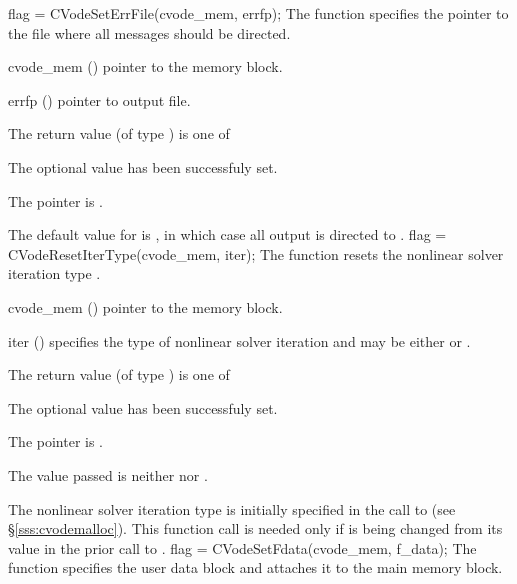 {
flag = CVodeSetErrFile(cvode\_mem, errfp);
}
{
  The function  specifies the pointer to the file
  where all {\cvodes} messages should be directed.
}
{
  \begin{args}
  \item[cvode\_mem] ()
    pointer to the {\cvodes} memory block.
  \item[errfp] ()
    pointer to output file.
  \end{args}
}
{
  The return value  (of type ) is one of
  \begin{args}
  \item[\Id{SUCCESS}] 
    The optional value has been successfuly set.
  \item[\Id{CVS\_NO\_MEM}]
    The  pointer is .
  \end{args}
}
{
  The default value for  is , in which case
  all output is directed to .
}
{
flag = CVodeResetIterType(cvode\_mem, iter);
}
{
  The function  resets the nonlinear solver
  iteration type .
}
{
  \begin{args}
  \item[cvode\_mem] ()
    pointer to the {\cvodes} memory block.
  \item[iter] ()
    specifies the type of nonlinear solver iteration and may be
    either  or . 
  \end{args}
}
{
  The return value  (of type ) is one of
  \begin{args}
  \item[\Id{SUCCESS}] 
    The optional value has been successfuly set.
  \item[\Id{CVS\_NO\_MEM}]
    The  pointer is .
  \item[\Id{CVS\_ILL\_INPUT}]
    The  value passed is neither  nor .
  \end{args}
}
{
  The nonlinear solver iteration type is initially specified in the call
  to  (see \S\ref{sss:cvodemalloc}). This function call is
  needed only if  is being changed from its value in the prior call 
  to .
}
{
  flag = CVodeSetFdata(cvode\_mem, f\_data);
}
{
  The function  specifies the user data block 
  and attaches it to the main {\cvodes} memory block.
}

